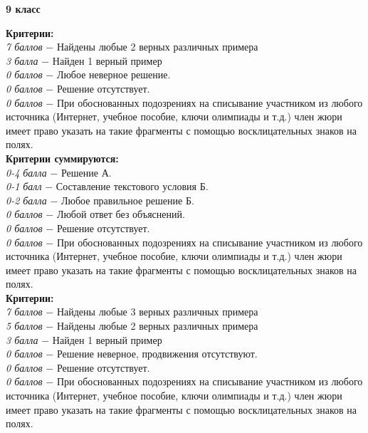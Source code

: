\centerline{\bf \Huge 9 класс}

 \textbf{Критерии:} \\
\textit{7 баллов} $-$ Найдены любые 2 верных различных примера\\
\textit{3 балла} $-$ Найден 1 верный пример\\
\textit{0 баллов} $-$ Любое неверное решение.\\
\textit{0 баллов} $-$ Решение отсутствует.\\
\textit{0 баллов} $-$ При обоснованных подозрениях на списывание участником из любого источника (Интернет, учебное пособие, ключи олимпиады и т.д.) член жюри имеет право указать на такие фрагменты с помощью восклицательных знаков на полях. \\

 \textbf{Критерии суммируются:} \\
\textit{0-4 балла} $-$ Решение А.\\
\textit{0-1 балл} $-$ Составление текстового условия Б.\\
\textit{0-2 балла} $-$ Любое правильное решение Б.\\
\textit{0 баллов} $-$ Любой ответ без объяснений.\\
\textit{0 баллов} $-$ Решение отсутствует.\\
\textit{0 баллов} $-$ При обоснованных подозрениях на списывание участником из любого источника (Интернет, учебное пособие, ключи олимпиады и т.д.) член жюри имеет право указать на такие фрагменты с помощью восклицательных знаков на полях. \\


 \textbf{Критерии:} \\
\textit{7 баллов} $-$ Найдены любые 3 верных различных примера\\
\textit{5 баллов} $-$ Найдены любые 2 верных различных примера\\
\textit{3 балла} $-$ Найден 1 верный пример\\
\textit{0 баллов} $-$ Решение неверное, продвижения отсутствуют.\\
\textit{0 баллов} $-$ Решение отсутствует.\\
\textit{0 баллов} $-$ При обоснованных подозрениях на списывание участником из любого источника (Интернет, учебное пособие, ключи олимпиады и т.д.) член жюри имеет право указать на такие фрагменты с помощью восклицательных знаков на полях. \\

